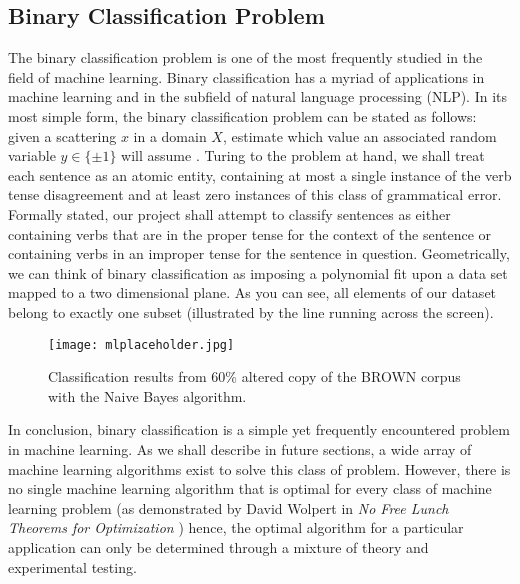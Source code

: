 \documentclass{article}
\begin{document}
\subsection{Binary Classification Problem}
The binary classification problem is one of the most frequently studied in the field of machine learning. Binary classification has a myriad of applications in machine learning and in the subfield of natural language processing (NLP). In its most simple form, the binary classification problem can be stated as follows: given a scattering $x$ in a domain $X$, estimate which value an associated random variable $y \in \{ \pm 1\}$ will assume \citep{Smola08introductionto}. Turing to the problem at hand, we shall treat each sentence as an atomic entity, containing at most a single instance of the verb tense disagreement and at least zero instances of this class of grammatical error. Formally stated, our project shall attempt to classify sentences as either containing verbs that are in the proper tense for the context of the sentence or containing verbs in an improper tense for the sentence in question. 
    Geometrically, we can think of binary classification as imposing a polynomial fit upon  a data set mapped to a two dimensional plane. As you can see, all elements of our dataset belong to exactly one subset (illustrated by the line running across the screen). 
\begin{center}
\begin{figure}[h!]
\centering
\texttt{[image: mlplaceholder.jpg]}
\caption{Classification results from 60\% altered copy of the BROWN corpus with the Naive Bayes algorithm.  }
\label{fig:univerise}
\end{figure}
\end{center}
In conclusion, binary classification is a simple yet frequently encountered problem in machine learning.  As we shall describe in future sections, a wide array of machine learning algorithms exist to solve this class of problem. However, there is no single machine learning algorithm that is optimal for every class of machine learning problem (as demonstrated by David Wolpert in \textit{No Free Lunch Theorems for Optimization} \citep{ref1}) hence, the optimal algorithm for a particular application can only be determined through a mixture of theory and experimental testing. 
\end{document}
